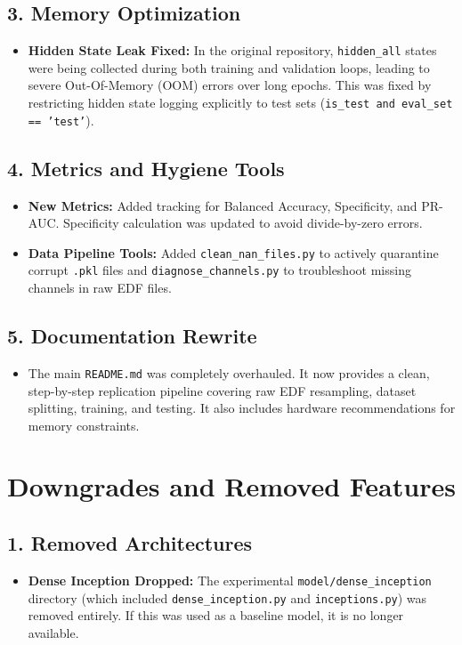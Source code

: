 \documentclass{article}
\begin{document}
\subsection*{3. Memory Optimization}
\begin{itemize}[label=\textcolor{blue}{$\bullet$}]
    \item \textbf{Hidden State Leak Fixed:} In the original repository, \texttt{hidden\_all} states were being collected during both training and validation loops, leading to severe Out-Of-Memory (OOM) errors over long epochs. This was fixed by restricting hidden state logging explicitly to test sets (\texttt{is\_test and eval\_set == 'test'}).
\end{itemize}

\subsection*{4. Metrics and Hygiene Tools}
\begin{itemize}[label=\textcolor{blue}{$\bullet$}]
    \item \textbf{New Metrics:} Added tracking for Balanced Accuracy, Specificity, and PR-AUC. Specificity calculation was updated to avoid divide-by-zero errors.
    \item \textbf{Data Pipeline Tools:} Added \texttt{clean\_nan\_files.py} to actively quarantine corrupt \texttt{.pkl} files and \texttt{diagnose\_channels.py} to troubleshoot missing channels in raw EDF files.
\end{itemize}

\subsection*{5. Documentation Rewrite}
\begin{itemize}[label=\textcolor{blue}{$\bullet$}]
    \item The main \texttt{README.md} was completely overhauled. It now provides a clean, step-by-step replication pipeline covering raw EDF resampling, dataset splitting, training, and testing. It also includes hardware recommendations for memory constraints.
\end{itemize}

\section*{Downgrades and Removed Features}
\subsection*{1. Removed Architectures}
\begin{itemize}[label=\textcolor{red}{$\bullet$}]
    \item \textbf{Dense Inception Dropped:} The experimental \texttt{model/dense\_inception} directory (which included \texttt{dense\_inception.py} and \texttt{inceptions.py}) was removed entirely. If this was used as a baseline model, it is no longer available.
\end{itemize}
\end{document}
